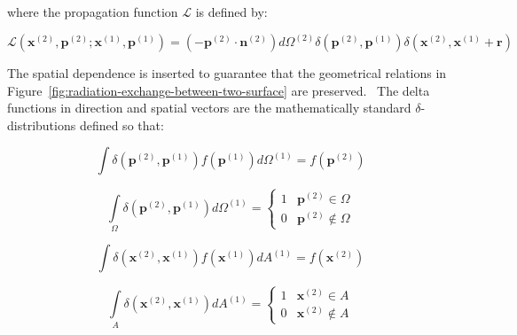 where the propagation function $\mathcal{L}$ is defined by:

\begin{equation}
\mathcal{L}({{\mathbf{x}}^{{\mathrm{(2)}}}},{{\mathbf{p}}^{{\mathrm{(2)}}}};{{\mathbf{x}}^{{\mathrm{(1)}}}},{{\mathbf{p}}^{{\mathrm{(1)}}}}) = \left( { - {{\mathbf{p}}^{{\mathrm{(2)}}}}\cdot {{\mathbf{n}}^{{\mathrm{(2)}}}}} \right)d{\Omega ^{{\mathrm{(2)}}}}\delta ({{\mathbf{p}}^{{\mathrm{(2)}}}},{{\mathbf{p}}^{{\mathrm{(1)}}}})\delta ({{\mathbf{x}}^{{\mathrm{(2)}}}},{{\mathbf{x}}^{{\mathrm{(1)}}}} + {\mathbf{r}})
\label{eq:ScriptLEquation}
\end{equation}

The spatial dependence is inserted to guarantee that the geometrical relations in Figure~\ref{fig:radiation-exchange-between-two-surface} are preserved.~ The delta functions in direction and spatial vectors are the mathematically standard \(\delta\)-distributions defined so that:

\begin{equation}
\int {\delta ({{\mathbf{p}}^{{\mathrm{(2)}}}},{{\mathbf{p}}^{{\mathrm{(1)}}}})} f({{\mathbf{p}}^{{\mathrm{(1)}}}})d{\Omega ^{{\mathrm{(1)}}}} = f({{\mathbf{p}}^{{\mathrm{(2)}}}})
\label{eq:deltap2p1fp1dOmega1Equation}
\end{equation}

\begin{equation}
\int\limits_\Omega  {\delta ({{\mathbf{p}}^{{\mathrm{(2)}}}},{{\mathbf{p}}^{{\mathrm{(1)}}}})d{\Omega ^{{\mathrm{(1)}}}}}  = \left\{ {\begin{array}{ccc}1&{{{\mathbf{p}}^{{\mathrm{(2)}}}} \in \Omega }\\0&{{{\mathbf{p}}^{{\mathrm{(2)}}}} \notin \Omega }\end{array}} \right.
\label{eq:deltap2p1dOmega1Integral}
\end{equation}

\begin{equation}
\int {\delta ({{\mathbf{x}}^{{\mathrm{(2)}}}},{{\mathbf{x}}^{{\mathrm{(1)}}}})} f({{\mathbf{x}}^{{\mathrm{(1)}}}})d{A^{{\mathrm{(1)}}}} = f({{\mathbf{x}}^{{\mathrm{(2)}}}})
\end{equation}

\begin{equation}
\int\limits_A {\delta ({{\mathbf{x}}^{{\mathrm{(2)}}}},{{\mathbf{x}}^{{\mathrm{(1)}}}})d{A^{{\mathrm{(1)}}}}}  = \left\{ {\begin{array}{ccc}1&{{{\mathbf{x}}^{{\mathrm{(2)}}}} \in A}\\0&{{{\mathbf{x}}^{{\mathrm{(2)}}}} \notin A}\end{array}} \right.
\end{equation}

